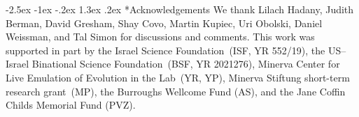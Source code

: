 \documentclass[12pt]{article}
\makeatletter
\renewcommand\section{\@startsection {section}{1}{\z@}%
     {-2.5ex \@plus -1ex \@minus -.2ex}%
     {1.3ex \@plus.2ex}%
    {\Large\bfseries}}
\makeatother
\begin{document}
{\small
\section*{Acknowledgements}
We thank Lilach Hadany, Judith Berman, David Gresham, Shay Covo, Martin Kupiec, Uri Obolski, Daniel Weissman, and Tal Simon for discussions and comments.
This work was supported in part by 
the Israel Science Foundation~(ISF, YR 552/19),
the US--Israel Binational Science Foundation~(BSF, YR 2021276),
Minerva Center for Live Emulation of Evolution in the Lab~(YR, YP),
Minerva Stiftung short-term research grant~(MP),
the Burroughs Wellcome Fund (AS),
and the Jane Coffin Childs Memorial Fund (PVZ).
}



\end{document}
